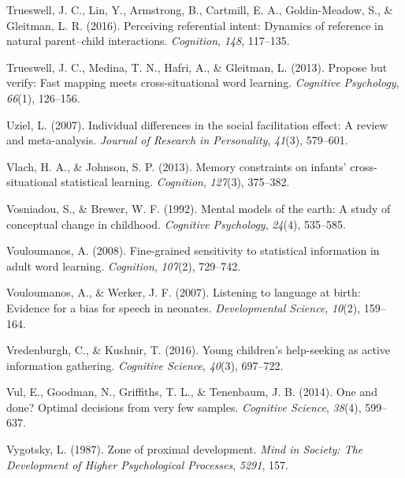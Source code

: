 \documentclass[oneside]{report}
\begin{document}
\leavevmode\hypertarget{ref-trueswell2016perceiving}{}%
Trueswell, J. C., Lin, Y., Armstrong, B., Cartmill, E. A.,
Goldin-Meadow, S., \& Gleitman, L. R. (2016). Perceiving referential
intent: Dynamics of reference in natural parent--child interactions.
\emph{Cognition}, \emph{148}, 117--135.

\leavevmode\hypertarget{ref-trueswell2013propose}{}%
Trueswell, J. C., Medina, T. N., Hafri, A., \& Gleitman, L. (2013).
Propose but verify: Fast mapping meets cross-situational word learning.
\emph{Cognitive Psychology}, \emph{66}(1), 126--156.

\leavevmode\hypertarget{ref-uziel2007individual}{}%
Uziel, L. (2007). Individual differences in the social facilitation
effect: A review and meta-analysis. \emph{Journal of Research in
Personality}, \emph{41}(3), 579--601.

\leavevmode\hypertarget{ref-vlach2013memory}{}%
Vlach, H. A., \& Johnson, S. P. (2013). Memory constraints on infants'
cross-situational statistical learning. \emph{Cognition}, \emph{127}(3),
375--382.

\leavevmode\hypertarget{ref-vosniadou1992mental}{}%
Vosniadou, S., \& Brewer, W. F. (1992). Mental models of the earth: A
study of conceptual change in childhood. \emph{Cognitive Psychology},
\emph{24}(4), 535--585.

\leavevmode\hypertarget{ref-vouloumanos2008fine}{}%
Vouloumanos, A. (2008). Fine-grained sensitivity to statistical
information in adult word learning. \emph{Cognition}, \emph{107}(2),
729--742.

\leavevmode\hypertarget{ref-vouloumanos2007listening}{}%
Vouloumanos, A., \& Werker, J. F. (2007). Listening to language at
birth: Evidence for a bias for speech in neonates. \emph{Developmental
Science}, \emph{10}(2), 159--164.

\leavevmode\hypertarget{ref-vredenburgh2016young}{}%
Vredenburgh, C., \& Kushnir, T. (2016). Young children's help-seeking as
active information gathering. \emph{Cognitive Science}, \emph{40}(3),
697--722.

\leavevmode\hypertarget{ref-vul2014}{}%
Vul, E., Goodman, N., Griffiths, T. L., \& Tenenbaum, J. B. (2014). One
and done? Optimal decisions from very few samples. \emph{Cognitive
Science}, \emph{38}(4), 599--637.

\leavevmode\hypertarget{ref-vygotsky1987zone}{}%
Vygotsky, L. (1987). Zone of proximal development. \emph{Mind in
Society: The Development of Higher Psychological Processes},
\emph{5291}, 157.
\end{document}

